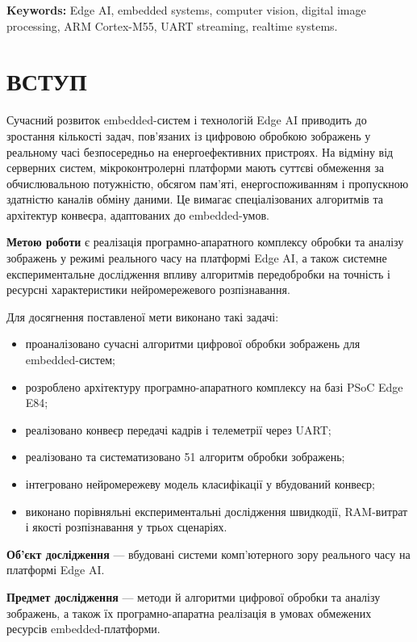 \documentclass[a4paper,12pt]{article}
\let\oldsection\section
\renewcommand{\section}{\clearpage\oldsection}
\begin{document}
\textbf{Keywords:} Edge AI, embedded systems, computer vision, digital image processing, ARM Cortex-M55, UART streaming, realtime systems.

\newpage

\section*{ВСТУП}
Сучасний розвиток embedded-систем і технологій Edge AI приводить до зростання кількості задач, пов'язаних із цифровою обробкою зображень у реальному часі безпосередньо на енергоефективних пристроях. На відміну від серверних систем, мікроконтролерні платформи мають суттєві обмеження за обчислювальною потужністю, обсягом пам'яті, енергоспоживанням і пропускною здатністю каналів обміну даними. Це вимагає спеціалізованих алгоритмів та архітектур конвеєра, адаптованих до embedded-умов.

\textbf{Метою роботи} є реалізація програмно-апаратного комплексу обробки та аналізу зображень у режимі реального часу на платформі Edge AI, а також системне експериментальне дослідження впливу алгоритмів передобробки на точність і ресурсні характеристики нейромережевого розпізнавання.

Для досягнення поставленої мети виконано такі задачі:
\begin{itemize}
	\item проаналізовано сучасні алгоритми цифрової обробки зображень для embedded-систем;
	\item розроблено архітектуру програмно-апаратного комплексу на базі PSoC Edge E84;
	\item реалізовано конвеєр передачі кадрів і телеметрії через UART;
	\item реалізовано та систематизовано 51 алгоритм обробки зображень;
	\item інтегровано нейромережеву модель класифікації у вбудований конвеєр;
	\item виконано порівняльні експериментальні дослідження швидкодії, RAM-витрат і якості розпізнавання у трьох сценаріях.
\end{itemize}

\textbf{Об'єкт дослідження} --- вбудовані системи комп'ютерного зору реального часу на платформі Edge AI.

\textbf{Предмет дослідження} --- методи й алгоритми цифрової обробки та аналізу зображень, а також їх програмно-апаратна реалізація в умовах обмежених ресурсів embedded-платформи.
\end{document}
